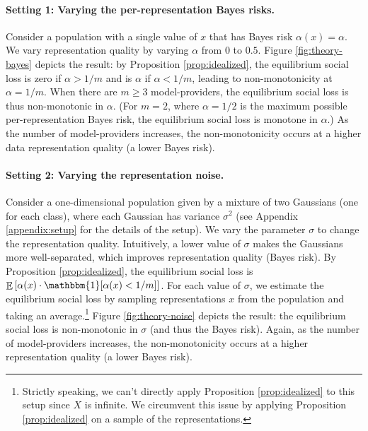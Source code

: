 \documentclass[letterpaper,11pt]{article}
\theoremstyle{plain}
\DeclareMathOperator*{\E}{\mathbb{E}}
\begin{document}
\paragraph{Setting 1: Varying the per-representation Bayes risks.} Consider a population with a single value of $x$ that has Bayes risk $\alpha(x) = \alpha$. We vary representation quality by varying $\alpha$ from $0$ to $0.5$. 
Figure \ref{fig:theory-bayes} depicts the result: by Proposition \ref{prop:idealized}, the equilibrium social loss is zero if $\alpha >1/m$ and is $\alpha$ if $\alpha < 1/m$, leading to  
non-monotonicity at $\alpha = 1/m$. When there are $m \ge 3$ model-providers, the equilibrium social loss is thus non-monotonic in $\alpha$. (For $m = 2$, where $\alpha = 1/2$ is the maximum possible per-representation Bayes risk, the equilibrium social loss is monotone in $\alpha$.) As the number of model-providers increases, the non-monotonicity occurs at a higher data representation quality (a lower Bayes risk). 

\paragraph{Setting 2: Varying the representation noise.} Consider a one-dimensional population given by a mixture of two Gaussians (one for each class), where each Gaussian has variance $\sigma^2$ (see Appendix \ref{appendix:setup} for the details of the setup). We vary the parameter $\sigma$ to change the representation quality. Intuitively, a lower value of $\sigma$ makes the Gaussians more well-separated, which improves representation quality (Bayes risk). By Proposition \ref{prop:idealized}, the equilibrium social loss is $\E \left[\alpha(x) \cdot \mathbbm{1}[\alpha(x) < 1/m] \right]$. For each value of $\sigma$, we estimate the equilibrium social loss by sampling representations $x$ from the population and taking an average.\footnote{Strictly speaking, we can't directly apply Proposition \ref{prop:idealized} to this setup since $X$ is infinite. We circumvent this issue by applying Proposition \ref{prop:idealized} on a sample of the representations.} 
Figure \ref{fig:theory-noise} depicts the result: the equilibrium social loss is non-monotonic in $\sigma$ (and thus the Bayes risk). Again, as the number of model-providers increases, the non-monotonicity occurs at a higher representation quality (a lower Bayes risk).  
\end{document}
